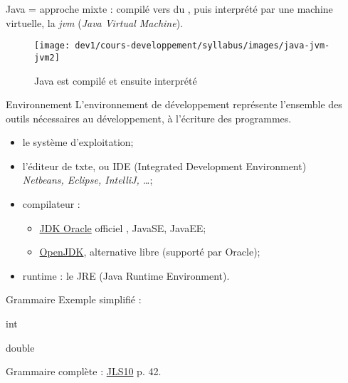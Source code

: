 \begin{frame}
  Java = approche mixte : compilé vers du , puis
  interprété par une machine virtuelle, la
  \textit{jvm}  (\textit{Java Virtual Machine}).

  \bigskip
  \begin{figure}[h]
  \begin{center}
  \texttt{[image: dev1/cours-developpement/syllabus/images/java-jvm-jvm2]}

  \caption{Java est compilé et ensuite interprété}
  \label{jvm}
  \end{center}
  \end{figure}
\end{frame}

\begin{frame}{Environnement}
  L'environnement de développement représente l'ensemble des outils
  nécessaires au développement, à l'écriture des programmes.

  \begin{itemize}
    \item le système d'exploitation;
    \item l'éditeur de txte, ou IDE (Integrated Development Environment)\\
      \textit{Netbeans, Eclipse, IntelliJ, \dots};
    \item compilateur :
      \begin{itemize}
        \item 
          \href{http://www.oracle.com/technetwork/java/javase/downloads}
          {JDK Oracle} \og officiel \fg, JavaSE, JavaEE;
        \item \href{http://openjdk.java.net/}{OpenJDK}, alternative libre
          (supporté par Oracle);
      \end{itemize}
    \item runtime : le JRE (Java Runtime Environment).
  \end{itemize}
\end{frame}

\begin{frame}[fragile]{Grammaire}
  Exemple simplifié :
\begin{grammaire}

    int

    double
\end{grammaire}

  Grammaire complète : \href{https://docs.oracle.com/javase/specs/jls/se10/jls10.pdf}{JLS10} p. 42.
\end{frame}

